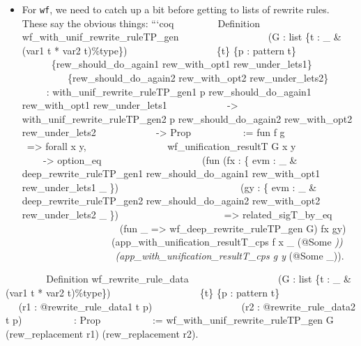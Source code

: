 \begin{itemize}
  \begin{itemize}
  \tightlist
  \item
    For \texttt{wf}, we need to catch up a bit before getting to lists
    of rewrite rules. These say the obvious things: ```coq ~ ~ ~ ~ ~
    Definition wf\_with\_unif\_rewrite\_ruleTP\_gen ~ ~ ~ ~ ~ ~ ~ ~ ~ ~
    ~(G : list \{t : \_ \& (var1 t * var2 t)\%type\}) ~ ~ ~ ~ ~ ~ ~ ~ ~
    ~ ~\{t\} \{p : pattern t\} ~ ~ ~ ~ ~ ~ ~ ~ ~ ~
    ~\{rew\_should\_do\_again1 rew\_with\_opt1 rew\_under\_lets1\} ~ ~ ~
    ~ ~ ~ ~ ~ ~ ~ ~\{rew\_should\_do\_again2 rew\_with\_opt2
    rew\_under\_lets2\} ~ ~ ~ ~ ~ ~ : with\_unif\_rewrite\_ruleTP\_gen1
    p rew\_should\_do\_again1 rew\_with\_opt1 rew\_under\_lets1 ~ ~ ~ ~
    ~ ~ ~ -\textgreater{} with\_unif\_rewrite\_ruleTP\_gen2 p
    rew\_should\_do\_again2 rew\_with\_opt2 rew\_under\_lets2 ~ ~ ~ ~ ~
    ~ ~ -\textgreater{} Prop ~ ~ ~ ~ ~ ~ := fun f g ~ ~ ~ ~ ~ ~ ~
    ~=\textgreater{} forall x y, ~ ~ ~ ~ ~ ~ ~ ~ ~
    ~wf\_unification\_resultT G x y ~ ~ ~ ~ ~ ~ ~ ~ ~ ~-\textgreater{}
    option\_eq ~ ~ ~ ~ ~ ~ ~ ~ ~ ~ ~ ~ (fun (fx : \{ evm : \_ \&
    deep\_rewrite\_ruleTP\_gen1 rew\_should\_do\_again1 rew\_with\_opt1
    rew\_under\_lets1 \_ \}) ~ ~ ~ ~ ~ ~ ~ ~ ~ ~ ~ ~ ~ ~ ~(gy : \{ evm :
    \_ \& deep\_rewrite\_ruleTP\_gen2 rew\_should\_do\_again2
    rew\_with\_opt2 rew\_under\_lets2 \_ \}) ~ ~ ~ ~ ~ ~ ~ ~ ~ ~ ~ ~
    ~=\textgreater{} related\_sigT\_by\_eq ~ ~ ~ ~ ~ ~ ~ ~ ~ ~ ~ ~ ~ ~ ~
    (fun \_ =\textgreater{} wf\_deep\_rewrite\_ruleTP\_gen G) fx gy) ~ ~
    ~ ~ ~ ~ ~ ~ ~ ~ ~ ~ (app\_with\_unification\_resultT\_cps f x \_
    (@Some \emph{)) ~ ~ ~ ~ ~ ~ ~ ~ ~ ~ ~ ~
    (app\_with\_unification\_resultT\_cps g y } (@Some \_)).
  \end{itemize}

  ~ ~ ~ ~ ~ Definition wf\_rewrite\_rule\_data ~ ~ ~ ~ ~ ~ ~ ~ ~ ~ ~(G :
  list \{t : \_ \& (var1 t * var2 t)\%type\}) ~ ~ ~ ~ ~ ~ ~ ~ ~ ~ ~\{t\}
  \{p : pattern t\} ~ ~ ~ ~ ~ ~ ~ ~ ~ ~ ~(r1 : @rewrite\_rule\_data1 t
  p) ~ ~ ~ ~ ~ ~ ~ ~ ~ ~ ~(r2 : @rewrite\_rule\_data2 t p) ~ ~ ~ ~ ~ ~ :
  Prop ~ ~ ~ ~ ~ ~ := wf\_with\_unif\_rewrite\_ruleTP\_gen G
  (rew\_replacement r1) (rew\_replacement r2).


\end{itemize}
